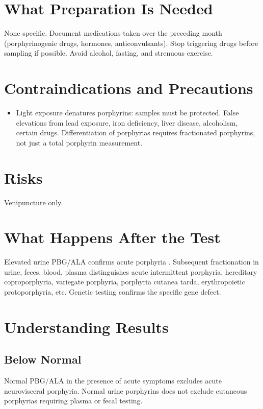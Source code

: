 \section*{What Preparation Is Needed}
None specific. Document medications taken over the preceding month (porphyrinogenic drugs, hormones, anticonvulsants). Stop triggering drugs before sampling if possible. Avoid alcohol, fasting, and strenuous exercise.

\section*{Contraindications and Precautions}
\begin{itemize}
  \item Light exposure denatures porphyrins: samples must be protected. False elevations from lead exposure, iron deficiency, liver disease, alcoholism, certain drugs. Differentiation of porphyrias requires fractionated porphyrins, not just a total porphyrin measurement.
\end{itemize}
\section*{Risks}
Venipuncture only.

\section*{What Happens After the Test}
Elevated urine PBG/ALA confirms acute porphyria \cite{anderson2005recommendations}. Subsequent fractionation in urine, feces, blood, plasma distinguishes acute intermittent porphyria, hereditary coproporphyria, variegate porphyria, porphyria cutanea tarda, erythropoietic protoporphyria, etc. Genetic testing confirms the specific gene defect.

\section*{Understanding Results}

\subsection*{Below Normal}
Normal PBG/ALA in the presence of acute symptoms excludes acute neurovisceral porphyria. Normal urine porphyrins does not exclude cutaneous porphyrias requiring plasma or fecal testing.

